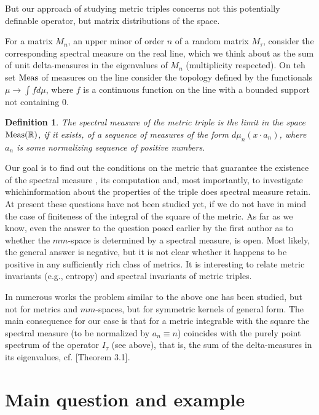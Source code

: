 \documentclass[11pt]{article}
\newcommand{\Meas}{\rm{Meas}}
\newtheorem{definition}{Definition}
\begin{document}
But our approach of studying metric triples concerns not this potentially definable operator, but
matrix distributions of the space.

For a matrix $M_n$, an upper minor of order $n$ of a random matrix
$M_\tau$, consider the corresponding spectral measure on the real line,
which we think about as the sum of unit delta-measures in the eigenvalues of $M_n$ 
(multiplicity respected). On teh set
$\Meas$ of measures on the line consider the topology defined by the functionals 
$\mu\to \int fd\mu$, where $f$ is a continuous function on the line
with a bounded support not containing 0.


\begin{definition}
The spectral measure of the metric triple is the limit in the space $\Meas({\Bbb R})$, if it exists, 
of a sequence of measures of the form $d\mu_n(x\cdot a_n)$, where $a_n$ is some normalizing sequence of positive numbers.
\end{definition}

Our goal is to find out the conditions on the metric that guarantee the existence of the spectral measure ,
its computation and, most importantly, to investigate whichinformation about the properties of the triple  does spectral measure
retain. At present these questions have not been studied yet, if we do not have in mind the case of finiteness 
of the integral of the square of the metric. 
As far as we know, even the answer to the question posed earlier by the first author as to whether the
$mm$-space is determined by a spectral measure, is open.
Most likely, the general answer is negative,
but it is not clear whether it happens to be positive in any sufficiently rich class of metrics. It is interesting to relate
metric invariants (e.g., entropy) and spectral invariants of metric triples.


In numerous works the problem similar to the above one has been studied, but not for metrics and $mm$-spaces, but for
symmetric kernels of general form. The main consequence for
our case is that for a metric integrable with the square the spectral measure
(to be normalized by $a_n\equiv n$)
coincides with the purely point spectrum of the operator $I_\tau$ (see above), that is, the sum of the delta-measures in its
eigenvalues, cf. \cite{KG}[Theorem 3.1].


\section{Main question and example}
\end{document}
